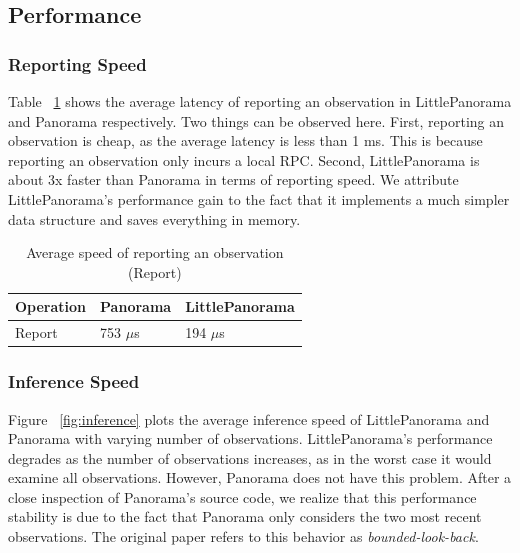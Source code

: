 \subsection{Performance}
\subsubsection{Reporting Speed} Table ~\ref{tab:microbench} shows the average latency of reporting an observation in LittlePanorama and Panorama respectively. Two things can be observed here. First, reporting an observation is cheap, as the average latency is less than 1 ms. This is because reporting an observation only incurs a local RPC. Second, LittlePanorama is about 3x faster than Panorama in terms of reporting speed. We attribute LittlePanorama's performance gain to the fact that it implements a much simpler data structure and saves everything in memory.

\begin{table}[!tb]
\begin{tabular}{p{}p{}p{}}%

\textbf{Operation} & \textbf{Panorama} & \textbf{LittlePanorama} \\
\midrule
  Report   &    753 $\mu$s  &  194 $\mu$s  \\
\end{tabular}
\vspace{0.5em}
\caption{Average speed of reporting an observation (Report)}
\label{tab:microbench}
\end{table}

\subsubsection{Inference Speed\label{subsubsec:inference}} Figure ~\ref{fig:inference} plots the average inference speed of LittlePanorama and Panorama with varying number of observations. LittlePanorama's performance degrades as the number of observations increases, as in the worst case it would examine all observations. However, Panorama does not have this problem. After a close inspection of Panorama's source code, we realize that this performance stability is due to the fact that Panorama only considers the two most recent observations. The original paper refers to this behavior as \textit{bounded-look-back}.

